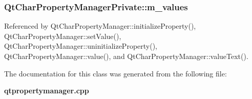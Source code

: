 \subsubsection[{m\+\_\+values}]{ Qt\+Char\+Property\+Manager\+Private\+::m\+\_\+values}\label{classQtCharPropertyManagerPrivate_af6327339ccb489c22016b9672e882100}


Referenced by Qt\+Char\+Property\+Manager\+::initialize\+Property(), Qt\+Char\+Property\+Manager\+::set\+Value(), Qt\+Char\+Property\+Manager\+::uninitialize\+Property(), Qt\+Char\+Property\+Manager\+::value(), and Qt\+Char\+Property\+Manager\+::value\+Text().



The documentation for this class was generated from the following file\+:\begin{DoxyCompactItemize}
\item 
{\bf qtpropertymanager.\+cpp}\end{DoxyCompactItemize}
